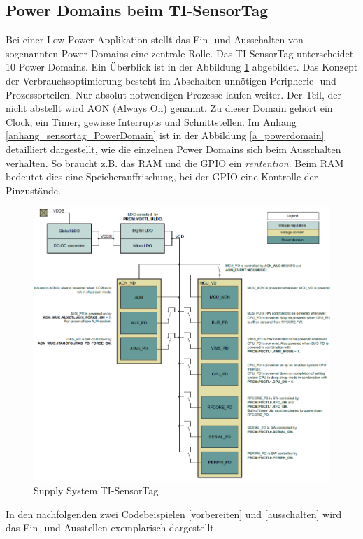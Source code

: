 \subsection{Power Domains beim TI-SensorTag}
\label{PowerDomains}

Bei einer Low Power Applikation stellt das Ein- und Ausschalten von sogenannten Power Domains eine zentrale Rolle. Das TI-SensorTag unterscheidet 10 Power Domains. Ein Überblick  ist in der Abbildung  \ref{supply_syst} abgebildet. Das Konzept der Verbrauchsoptimierung besteht im Abschalten unnötigen Peripherie- und Prozessorteilen. Nur absolut notwendigen Prozesse laufen weiter. Der Teil, der nicht abstellt wird AON (Always On) genannt. Zu dieser Domain gehört ein Clock, ein Timer, gewisse Interrupts und Schnittstellen. Im Anhang \ref{anhang_sensortag_PowerDomain} ist in der Abbildung \ref{a_powerdomain} detailliert dargestellt, wie die einzelnen Power Domains sich beim Ausschalten verhalten. So braucht z.B. das RAM und die GPIO ein \textit{rentention}. Beim RAM bedeutet dies eine Speicherauffrischung, bei der GPIO eine Kontrolle der Pinzustände.


\begin{figure}[ht]
  \includegraphics[width=1.0\textwidth]{3Vorgehen/imag/powerdomain_1.png}
  \caption{Supply System TI-SensorTag}
  \label{supply_syst}
\end{figure}

In den nachfolgenden zwei Codebeispielen \ref{vorbereiten} und \ref{ausschalten} wird das Ein- und Ausstellen exemplarisch dargestellt. %

